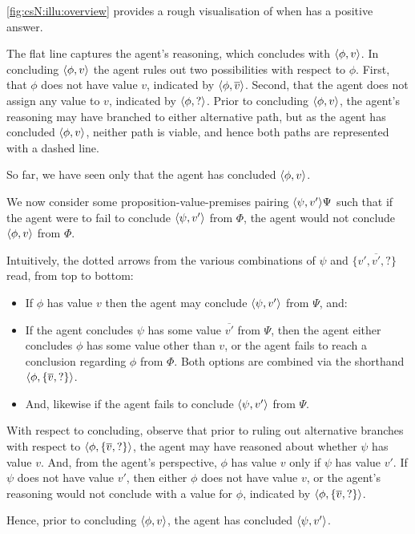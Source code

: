 \begin{note}[Figure]
  \autoref{fig:csN:illu:overview} provides a rough visualisation of when \qzS{} has a positive answer.

  The flat line captures the agent's reasoning, which concludes with \(\langle \phi, v \rangle\).
  In concluding \(\langle \phi, v \rangle\) the agent rules out two possibilities with respect to \(\phi\).
  First, that \(\phi\) does not have value \(v\), indicated by \(\langle \phi, \overline{v} \rangle\).
  Second, that the agent does not assign any value to \(v\), indicated by \(\langle \phi, ? \rangle\).
  Prior to concluding \(\langle \phi, v \rangle\), the agent's reasoning may have branched to either alternative path, but as the agent has concluded \(\langle \phi, v \rangle\), neither path is viable, and hence both paths are represented with a dashed line.

  So far, we have seen only that the agent has concluded \(\langle \phi, v \rangle\).

  We now consider some proposition-value-premises pairing \(\langle \psi, v' \rangle{\Psi}\) such that if the agent were to fail to conclude \(\langle \psi, v' \rangle\) from \(\Phi\), the agent would not conclude \(\langle \phi, v \rangle\) from \(\Phi\).

  Intuitively, the dotted arrows from the various combinations of \(\psi\) and \(\{v',\overline{v'},?\}\) read, from top to bottom:
  \begin{itemize}
  \item If \(\phi\) has value \(v\) then the agent may conclude \(\langle \psi, v' \rangle\) from \(\Psi\), and:
  \item If the agent concludes \(\psi\) has some value \(\overline{v'}\) from \(\Psi\), then the agent either concludes \(\phi\) has some value other than \(v\), or the agent fails to reach a conclusion regarding \(\phi\) from \(\Phi\).
    Both options are combined via the shorthand \(\langle \phi, \{\overline{v},?\} \rangle\).
  \item
    And, likewise if the agent fails to conclude \(\langle \psi, v' \rangle\) from \(\Psi\).
  \end{itemize}

  With respect to concluding, observe that prior to ruling out alternative branches with respect to \(\langle \phi, \{\overline{v},?\} \rangle\), the agent may have reasoned about whether \(\psi\) has value \(v\).
  And, from the agent's perspective, \(\phi\) has value \(v\) only if \(\psi\) has value \(v'\).
  If \(\psi\) does not have value \(v'\), then either \(\phi\) does not have value \(v\), or the agent's reasoning would not conclude with a value for \(\phi\), indicated by \(\langle \phi, \{\overline{v},?\} \rangle\).

  Hence, prior to concluding \(\langle \phi, v \rangle\), the agent has concluded \(\langle \psi, v' \rangle\).
\end{note}

